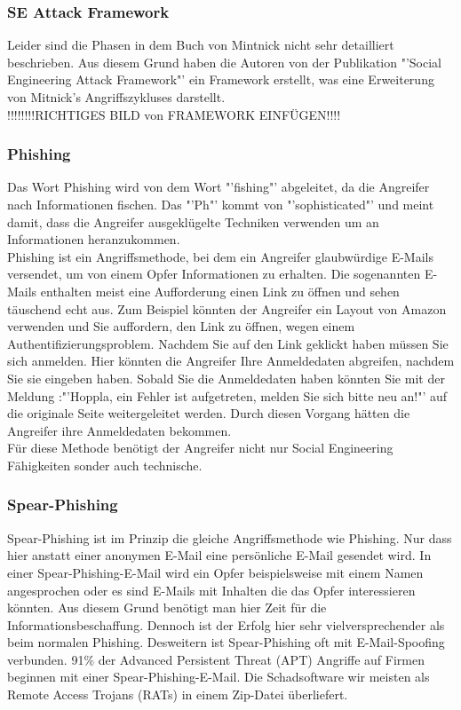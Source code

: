 \subsubsection{SE Attack Framework}
Leider sind die Phasen in dem Buch von Mintnick \cite{ArtOfDeception} nicht sehr detailliert beschrieben. Aus diesem Grund haben die Autoren von der Publikation "'Social Engineering Attack Framework"' \cite{AttackFramework} ein Framework erstellt, was eine Erweiterung von Mitnick's Angriffszykluses darstellt.\\

!!!!!!!!RICHTIGES BILD von FRAMEWORK EINFÜGEN!!!!\\

\subsubsection{Phishing}
Das Wort Phishing wird von dem Wort "'fishing"' abgeleitet, da die Angreifer nach Informationen fischen. Das "'Ph"' kommt von "'sophisticated"' und meint damit, dass die Angreifer ausgeklügelte Techniken verwenden um an Informationen heranzukommen.\cite{PhishingExposed}\\
Phishing ist ein Angriffsmethode, bei dem ein Angreifer glaubwürdige E-Mails versendet, um von einem Opfer Informationen zu erhalten. Die sogenannten E-Mails enthalten meist eine Aufforderung einen Link zu öffnen und sehen täuschend echt aus. Zum Beispiel könnten der Angreifer ein Layout von Amazon verwenden und Sie auffordern, den Link zu öffnen, wegen einem Authentifizierungsproblem. Nachdem Sie auf den Link geklickt haben müssen Sie sich anmelden. Hier könnten die Angreifer Ihre Anmeldedaten abgreifen, nachdem Sie sie eingeben haben. Sobald Sie die Anmeldedaten haben könnten Sie mit der Meldung :"'Hoppla, ein Fehler ist aufgetreten, melden Sie sich bitte neu an!"' auf die originale Seite weitergeleitet werden. Durch diesen Vorgang hätten die Angreifer ihre Anmeldedaten bekommen.\\
Für diese Methode benötigt der Angreifer nicht nur Social Engineering Fähigkeiten sonder auch technische.\cite{PhishingDarkWaters}

\subsubsection{Spear-Phishing}
Spear-Phishing ist im Prinzip die gleiche Angriffsmethode wie Phishing. Nur dass hier anstatt einer anonymen E-Mail eine persönliche E-Mail gesendet wird. In einer Spear-Phishing-E-Mail wird ein Opfer beispielsweise mit einem Namen angesprochen oder es sind E-Mails mit Inhalten die das Opfer interessieren könnten. Aus diesem Grund benötigt man hier Zeit für die Informationsbeschaffung. Dennoch ist der Erfolg hier sehr vielversprechender als beim normalen Phishing. Desweitern ist Spear-Phishing oft mit E-Mail-Spoofing verbunden.
91\% der Advanced Persistent Threat (APT) Angriffe auf Firmen beginnen mit einer Spear-Phishing-E-Mail. Die Schadsoftware wir meisten als Remote Access Trojans (RATs) in einem Zip-Datei überliefert.\cite{SpearPhishing}


